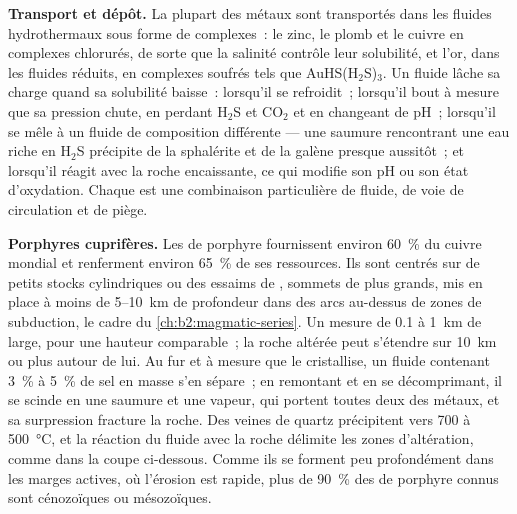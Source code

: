 \textbf{Transport et dépôt.} La plupart des métaux sont transportés dans les fluides hydrothermaux sous forme
de complexes~: le zinc, le plomb et le cuivre en complexes chlorurés, de sorte que la salinité contrôle leur
solubilité, et l'or, dans les fluides réduits, en complexes soufrés tels que AuHS(H$_2$S)$_3$. Un fluide
lâche sa charge quand sa solubilité baisse~: lorsqu'il se refroidit~; lorsqu'il bout à mesure que sa pression
chute, en perdant H$_2$S et CO$_2$ et en changeant de pH~; lorsqu'il se mêle à un fluide de composition différente
--- une saumure rencontrant une eau riche en H$_2$S précipite de la sphalérite et de la galène presque
aussitôt~; et lorsqu'il réagit avec la roche encaissante, ce qui modifie son pH ou son état d'oxydation.
Chaque  est une combinaison particulière de fluide, de voie de circulation et de piège.

\textbf{Porphyres cuprifères.} Les  de porphyre fournissent environ \qty{60}{\percent} du cuivre mondial
et renferment environ \qty{65}{\percent} de ses ressources. Ils sont centrés sur de petits stocks cylindriques
ou des essaims de , sommets de  plus grands, mis en place à moins de 5--\qty{10}{km} de profondeur
dans des arcs au-dessus de zones de subduction, le cadre du \cref{ch:b2:magmatic-series}. Un  mesure
de \num{0.1} à \qty{1}{km} de large, pour une hauteur comparable~; la roche altérée peut s'étendre sur \qty{10}{km}
ou plus autour de lui. Au fur et à mesure que le  cristallise, un fluide contenant \qty{3}{\percent}
à \qty{5}{\percent} de sel en masse s'en sépare~; en remontant et en se décomprimant, il se scinde en une saumure
et une vapeur, qui portent toutes deux des métaux, et sa surpression fracture la roche. Des veines de quartz
précipitent vers 700 à \qty{500}{\celsius}, et la réaction du fluide avec la roche délimite les zones d'altération,
comme dans la coupe ci-dessous. Comme ils se forment peu profondément dans les marges actives, où l'érosion
est rapide, plus de \qty{90}{\percent} des  de porphyre connus sont cénozoïques ou mésozoïques.

